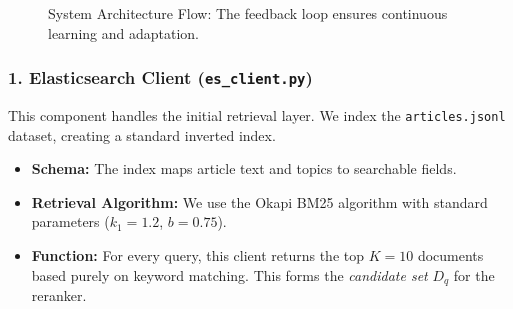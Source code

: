 \documentclass[11pt,a4paper]{article}
\begin{document}
\begin{figure}[ht]
    \centering
    \caption{System Architecture Flow: The feedback loop ensures continuous learning and adaptation.}
    \label{fig:arch}
\end{figure}

\subsubsection{1. Elasticsearch Client (\texttt{es\_client.py})}
This component handles the initial retrieval layer. We index the \texttt{articles.jsonl} dataset, creating a standard inverted index.
\begin{itemize}
    \item \textbf{Schema:} The index maps article text and topics to searchable fields.
    \item \textbf{Retrieval Algorithm:} We use the Okapi BM25 algorithm with standard parameters ($k_1=1.2$, $b=0.75$).
    \item \textbf{Function:} For every query, this client returns the top $K=10$ documents based purely on keyword matching. This forms the \textit{candidate set} $D_q$ for the reranker.
\end{itemize}
\end{document}
